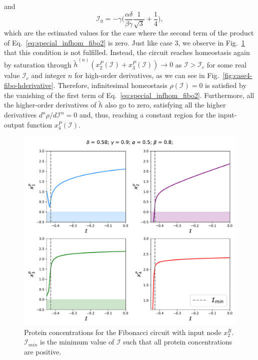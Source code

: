 and 
\begin{equation}
    \mathcal{I}_0 = -\gamma \bigg(\frac{\alpha\delta}{\beta\gamma}\frac{1}{\sqrt{3}} + \frac{1}{4}\bigg),
\end{equation}
which are the estimated values for the case where the second term of the product 
of Eq.~\ref{eq:special_infhom_fibo2} is zero. Just like case 3, we observe in Fig.~\ref{fig:case4-fibo-chair}
that this condition is not fulfilled. Instead, the circuit reaches homeostasis again by saturation through
$\tilde{h}^{(n)}(x_2^P(\mathcal{I})+x_3^P(\mathcal{I})) \rightarrow 0$ as $\mathcal{I} > \mathcal{I}_c$
for some real value $\mathcal{I}_c$ and integer $n$ for high-order derivatives, as we can see 
in Fig.~\ref{fig:case4-fibo-hderivative}. Therefore, infinitesimal homeostasis $\rho(\mathcal{I}) = 0$
is satisfied by the vanishing of the first term of Eq.~\ref{eq:special_infhom_fibo2}. Furthermore, all the 
higher-order derivatives of $\tilde{h}$ also go to zero, satisfying all the higher derivatives $d^n\rho/d\mathcal{I}^n = 0$
and, thus, reaching a constant region for the input-output function $x_4^P(\mathcal{I})$.

\begin{figure}[H]
    \centering
    \includegraphics[scale=0.48]{figs/numerics/fibo_x2r_case4.pdf}
    \caption{Protein concentrations for the Fibonacci circuit with input node $x_2^R$. 
    $\mathcal{I}_{min}$ is the minimum value of $\mathcal{I}$ such that all protein 
    concentrations are positive.}
    \label{fig:case4-fibo-chair}
\end{figure}


